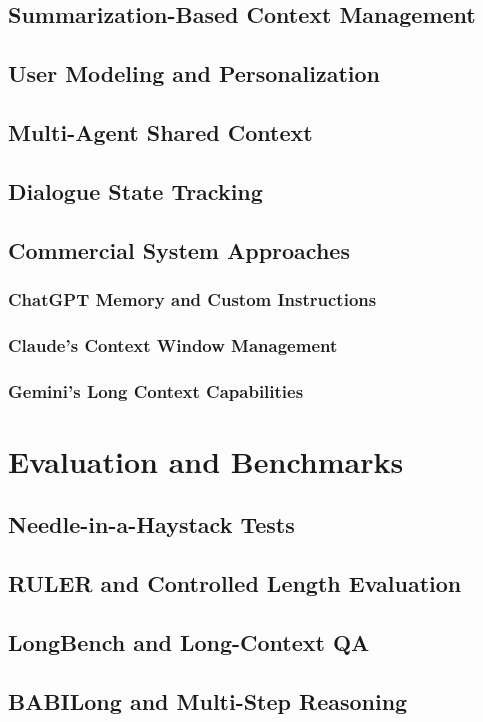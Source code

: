 \documentclass[12pt, letterpaper]{article}
\begin{document}
\subsection{Summarization-Based Context Management}
\subsection{User Modeling and Personalization}
\subsection{Multi-Agent Shared Context}
\subsection{Dialogue State Tracking}
\subsection{Commercial System Approaches}
\subsubsection{ChatGPT Memory and Custom Instructions}
\subsubsection{Claude's Context Window Management}
\subsubsection{Gemini's Long Context Capabilities}

\section{Evaluation and Benchmarks}
\subsection{Needle-in-a-Haystack Tests}
\subsection{RULER and Controlled Length Evaluation}
\subsection{LongBench and Long-Context QA}
\subsection{BABILong and Multi-Step Reasoning}
\end{document}
